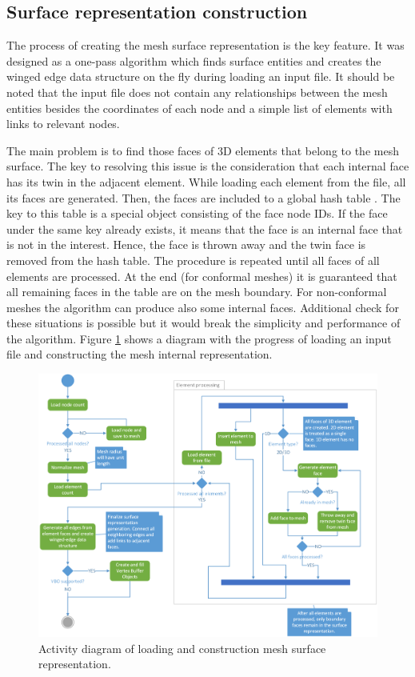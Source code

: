 \subsection{Surface representation construction}

The process of creating the mesh surface representation is the key feature. It was designed as a one-pass algorithm which finds surface entities and creates the winged edge data structure on the fly during loading an input file. It should be noted that the input file does not contain any relationships between the mesh entities besides the coordinates of each node and a simple list of elements with links to relevant nodes.

The main problem is to find those faces of 3D elements that belong to the mesh surface. The key to resolving this issue is the consideration that each internal face has its twin in the adjacent element. While loading each element from the file, all its faces are generated. Then, the faces are included to a global hash table \cite{Knuth1998}. The key to this table is a special object consisting of the face node IDs. If the face under the same key already exists, it means that the face is an internal face that is not in the interest. Hence, the face is thrown away and the twin face is removed from the hash table. The procedure is repeated until all faces of all elements are processed. At the end (for conformal meshes) it is guaranteed that all remaining faces in the table are on the mesh boundary. For non-conformal meshes the algorithm can produce also some internal faces. Additional check for these situations is possible but it would break the simplicity and performance of the algorithm. Figure \ref{fig:mesh-construction} shows a diagram with the progress of loading an input file and constructing the mesh internal representation.

\begin{figure}[H]
\centering
\includegraphics[width=\textwidth]{figures/chapter-mesh-visualization/figure6}
\decoRule
\caption[Activity diagram of mesh construction.]{Activity diagram of loading and construction mesh surface representation.}
\label{fig:mesh-construction}
\end{figure}

